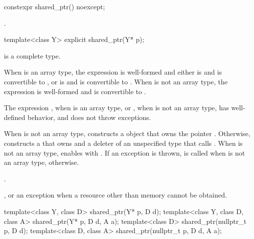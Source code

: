 %
\begin{itemdecl}
constexpr shared_ptr() noexcept;
\end{itemdecl}

\begin{itemdescr}
\pnum
\ensures
{}.
\end{itemdescr}

%
\begin{itemdecl}
template<class Y> explicit shared_ptr(Y* p);
\end{itemdecl}

\begin{itemdescr}
\pnum
\mandates
{} is a complete type.

\pnum
\constraints
When  is an array type,
the expression  is well-formed and either
 is  and  is convertible to , or
 is  and  is convertible to .
When  is not an array type,
the expression  is well-formed and
 is convertible to .

\pnum
\expects
The expression
, when  is an array type, or
, when  is not an array type,
has well-defined behavior, and
does not throw exceptions.

\pnum
\effects
When  is not an array type,
constructs a  object
that owns the pointer .
Otherwise, constructs a 
that owns  and a deleter of an
unspecified type that calls .
When  is not an array type,
enables  with .
If an exception is thrown,  is called
when  is not an array type,  otherwise.

\pnum
\ensures
{}.

\pnum
\throws
{}, or an  exception when a resource other than memory cannot be obtained.
\end{itemdescr}

%
\begin{itemdecl}
template<class Y, class D> shared_ptr(Y* p, D d);
template<class Y, class D, class A> shared_ptr(Y* p, D d, A a);
template<class D> shared_ptr(nullptr_t p, D d);
template<class D, class A> shared_ptr(nullptr_t p, D d, A a);
\end{itemdecl}

